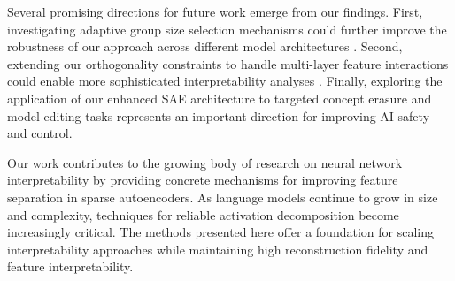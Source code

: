 \documentclass{article} %
\begin{document}
Several promising directions for future work emerge from our findings. First, investigating adaptive group size selection mechanisms could further improve the robustness of our approach across different model architectures \cite{ghilardiEfficientTrainingSparse2024a}. Second, extending our orthogonality constraints to handle multi-layer feature interactions could enable more sophisticated interpretability analyses \cite{gurneeFindingNeuronsHaystack2023}. Finally, exploring the application of our enhanced SAE architecture to targeted concept erasure \cite{karvonenEvaluatingSparseAutoencoders2024} and model editing tasks represents an important direction for improving AI safety and control.

Our work contributes to the growing body of research on neural network interpretability by providing concrete mechanisms for improving feature separation in sparse autoencoders. As language models continue to grow in size and complexity, techniques for reliable activation decomposition become increasingly critical. The methods presented here offer a foundation for scaling interpretability approaches while maintaining high reconstruction fidelity and feature interpretability.



\end{document}
